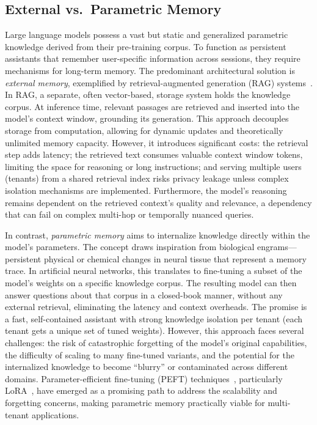 \documentclass[conference]{IEEEtran}
\begin{document}
\subsection{External vs.\ Parametric Memory}
Large language models possess a vast but static and generalized parametric knowledge derived from their pre-training corpus. To function as persistent assistants that remember user-specific information across sessions, they require mechanisms for long-term memory. The predominant architectural solution is \textit{external memory}, exemplified by retrieval-augmented generation (RAG) systems~\cite{lewis2020rag}. In RAG, a separate, often vector-based, storage system holds the knowledge corpus. At inference time, relevant passages are retrieved and inserted into the model's context window, grounding its generation. This approach decouples storage from computation, allowing for dynamic updates and theoretically unlimited memory capacity. However, it introduces significant costs: the retrieval step adds latency; the retrieved text consumes valuable context window tokens, limiting the space for reasoning or long instructions; and serving multiple users (tenants) from a shared retrieval index risks privacy leakage unless complex isolation mechanisms are implemented. Furthermore, the model's reasoning remains dependent on the retrieved context's quality and relevance, a dependency that can fail on complex multi-hop or temporally nuanced queries.

In contrast, \textit{parametric memory} aims to internalize knowledge directly within the model's parameters. The concept draws inspiration from biological engrams---persistent physical or chemical changes in neural tissue that represent a memory trace. In artificial neural networks, this translates to fine-tuning a subset of the model's weights on a specific knowledge corpus. The resulting model can then answer questions about that corpus in a closed-book manner, without any external retrieval, eliminating the latency and context overheads. The promise is a fast, self-contained assistant with strong knowledge isolation per tenant (each tenant gets a unique set of tuned weights). However, this approach faces several challenges: the risk of catastrophic forgetting of the model's original capabilities, the difficulty of scaling to many fine-tuned variants, and the potential for the internalized knowledge to become ``blurry'' or contaminated across different domains. Parameter-efficient fine-tuning (PEFT) techniques~\cite{lialin2023peft}, particularly LoRA~\cite{hu2022lora}, have emerged as a promising path to address the scalability and forgetting concerns, making parametric memory practically viable for multi-tenant applications.
\end{document}
